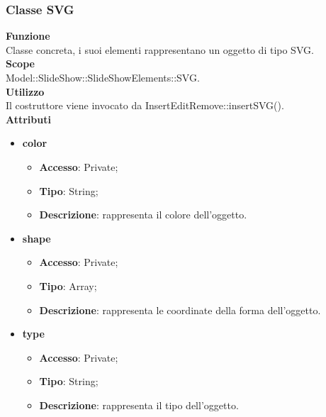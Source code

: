 {	\subsubsection{Classe SVG}{
		\label{SVG}
		\textbf{Funzione}\\
			\indent Classe concreta, i suoi elementi rappresentano un oggetto di tipo SVG.\\
	   	\textbf{Scope}\\
			\indent Model::SlideShow::SlideShowElements::SVG.\\
		\textbf{Utilizzo}\\
			\indent Il costruttore viene invocato da InsertEditRemove::insertSVG().\\
		\textbf{Attributi}
		\begin{itemize}
			\item \textbf{color}
			\begin{itemize}
				\item \textbf{Accesso}: Private;
				\item \textbf{Tipo}: String;
				\item \textbf{Descrizione}: rappresenta il colore dell’oggetto.
			\end{itemize}
			\item \textbf{shape}
			\begin{itemize}
				\item \textbf{Accesso}: Private;
				\item \textbf{Tipo}: Array;
				\item \textbf{Descrizione}: rappresenta le coordinate della forma dell’oggetto.
			\end{itemize}
			\item \textbf{type}
			\begin{itemize}
				\item \textbf{Accesso}: Private;
				\item \textbf{Tipo}: String;
				\item \textbf{Descrizione}: rappresenta il tipo dell'oggetto.
			\end{itemize}
		\end{itemize}
		}
}
